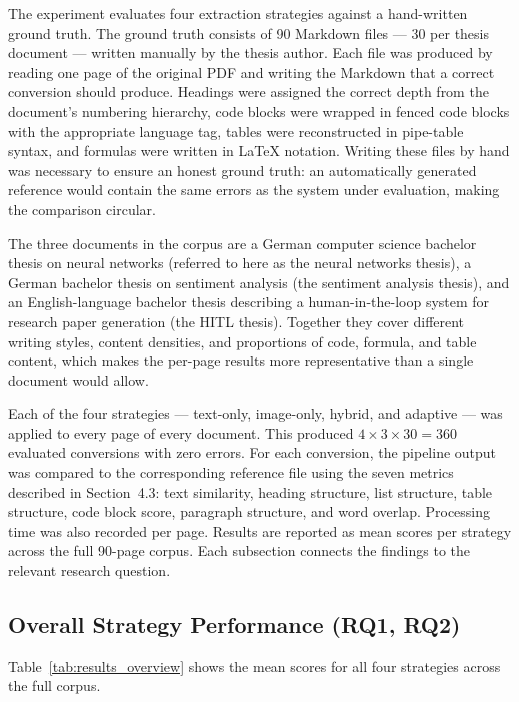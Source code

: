\documentclass[12pt]{article}
\begin{document}
The experiment evaluates four extraction strategies against a
hand-written ground truth. The ground truth consists of 90 Markdown
files — 30 per thesis document — written manually by the thesis author.
Each file was produced by reading one page of the original PDF and
writing the Markdown that a correct conversion should produce.
Headings were assigned the correct depth from the document's numbering
hierarchy, code blocks were wrapped in fenced code blocks with the
appropriate language tag, tables were reconstructed in pipe-table
syntax, and formulas were written in LaTeX notation.
Writing these files by hand was necessary to ensure an honest ground
truth: an automatically generated reference would contain the same
errors as the system under evaluation, making the comparison circular.

The three documents in the corpus are a German computer science
bachelor thesis on neural networks (referred to here as the neural
networks thesis), a German bachelor thesis on sentiment analysis
(the sentiment analysis thesis), and an English-language bachelor
thesis describing a human-in-the-loop system for research paper
generation (the HITL thesis). Together they cover different writing
styles, content densities, and proportions of code, formula, and
table content, which makes the per-page results more representative
than a single document would allow.

Each of the four strategies — text-only, image-only, hybrid, and
adaptive — was applied to every page of every document. This produced
$4 \times 3 \times 30 = 360$ evaluated conversions with zero errors.
For each conversion, the pipeline output was compared to the
corresponding reference file using the seven metrics described in
Section~4.3: text similarity, heading structure, list structure,
table structure, code block score, paragraph structure, and word
overlap. Processing time was also recorded per page.
Results are reported as mean scores per strategy across the full
90-page corpus. Each subsection connects the findings to the relevant
research question.

\subsection{Overall Strategy Performance (RQ1, RQ2)}

Table~\ref{tab:results_overview} shows the mean scores for all four
strategies across the full corpus.
\end{document}
